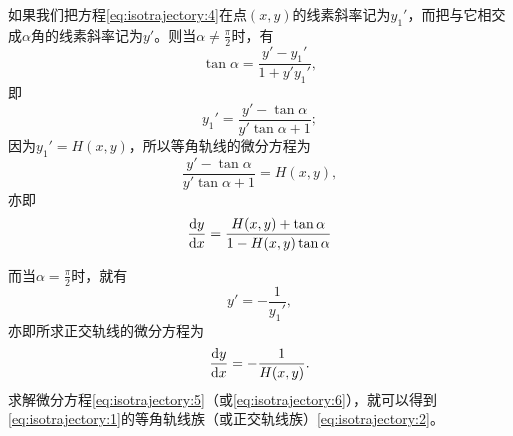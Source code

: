 如果我们把方程\eqref{eq:isotrajectory:4}在点$(x,y)$的线素斜率记为$y_1'$，而把与它相交成$\alpha$角的线素斜率记为$y'$。则当$\alpha\neq\frac{\pi}{2}$时，有
\[
\tan\alpha=\frac{y'-y_1'}{1+y'y_1'},
\]
即
\[
y_1'=\frac{y'-\tan\alpha}{y'\tan\alpha+1};
\]
因为$y_1'=H(x,y)$，所以等角轨线的微分方程为
\[
\frac{y'-\tan\alpha}{y'\tan\alpha+1}=H(x,y),
\]
亦即
\begin{equation}\label{eq:isotrajectory:5}
\frac{\mathrm{d}{}y}{\mathrm{d}{}x}=\frac{H(x,y)+\tan\alpha}{1-H(x,y)\tan\alpha}
\end{equation}

而当$\alpha=\frac{\pi}{2}$时，就有
\[
y'=-\frac{1}{y_1'},
\]
亦即所求正交轨线的微分方程为
\begin{equation}\label{eq:isotrajectory:6}
\frac{\mathrm{d}{}y}{\mathrm{d}{}x}=-\frac{1}{H(x,y)}.
\end{equation}
求解微分方程\eqref{eq:isotrajectory:5}（或\eqref{eq:isotrajectory:6}），就可以得到\eqref{eq:isotrajectory:1}的等角轨线族（或正交轨线族）\eqref{eq:isotrajectory:2}。